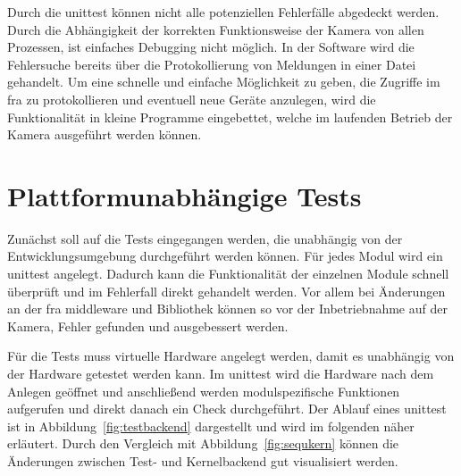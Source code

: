 Durch die \gls{unittest} können nicht alle potenziellen Fehlerfälle abgedeckt werden. Durch die Abhängigkeit der korrekten Funktionsweise der Kamera von allen Prozessen, ist einfaches Debugging nicht möglich. In der Software wird die Fehlersuche bereits über die Protokollierung von Meldungen in einer Datei gehandelt. Um eine schnelle und einfache Möglichkeit zu geben, die Zugriffe im \ac{fra} zu protokollieren und eventuell neue Geräte anzulegen, wird die Funktionalität in kleine Programme eingebettet, welche im laufenden Betrieb der Kamera ausgeführt werden können.



\section{Plattformunabhängige Tests}
Zunächst soll auf die Tests eingegangen werden, die unabhängig von der Entwicklungsumgebung durchgeführt werden können. Für jedes Modul wird ein \gls{unittest} angelegt. Dadurch kann die Funktionalität der einzelnen Module schnell überprüft und im Fehlerfall direkt gehandelt werden. Vor allem bei Änderungen an der \ac{fra} \gls{middleware} und Bibliothek können so vor der Inbetriebnahme auf der Kamera, Fehler gefunden und ausgebessert werden.


Für die Tests muss virtuelle Hardware angelegt werden, damit es unabhängig von der Hardware getestet werden kann. Im \gls{unittest} wird die Hardware nach dem Anlegen geöffnet und anschließend werden modulspezifische Funktionen aufgerufen und direkt danach ein Check durchgeführt. 
Der Ablauf eines \gls{unittest} ist in Abbildung~\ref{fig:testbackend} dargestellt und wird im folgenden näher erläutert. Durch den Vergleich mit Abbildung~\ref{fig:sequkern} können die Änderungen zwischen Test- und Kernelbackend gut visualisiert werden.


